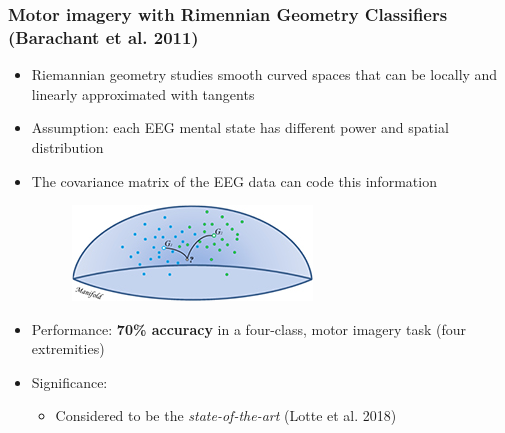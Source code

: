 \documentclass{beamer}
\begin{document}
\begin{frame}
	\frametitle{Motor imagery with Rimennian Geometry Classifiers (Barachant et al. 2011)}
	
	\begin{itemize}

		\item Riemannian geometry studies smooth curved spaces that can be locally and linearly approximated with tangents
		
		\item Assumption: each EEG mental state has different power and spatial distribution

		\item The covariance matrix of the EEG data can code this information
		\begin{figure}
			\centering
			\includegraphics[scale=0.5]{fig8.jpg}
		\end{figure}

		\item Performance: \textbf{70\% accuracy} in a four-class, motor imagery task (four extremities)

		\item Significance: 
		\begin{itemize}
			\item Considered to be the \textit{state-of-the-art} (Lotte et al. 2018)
		\end{itemize}	

	\end{itemize}

\end{frame}
\end{document}
